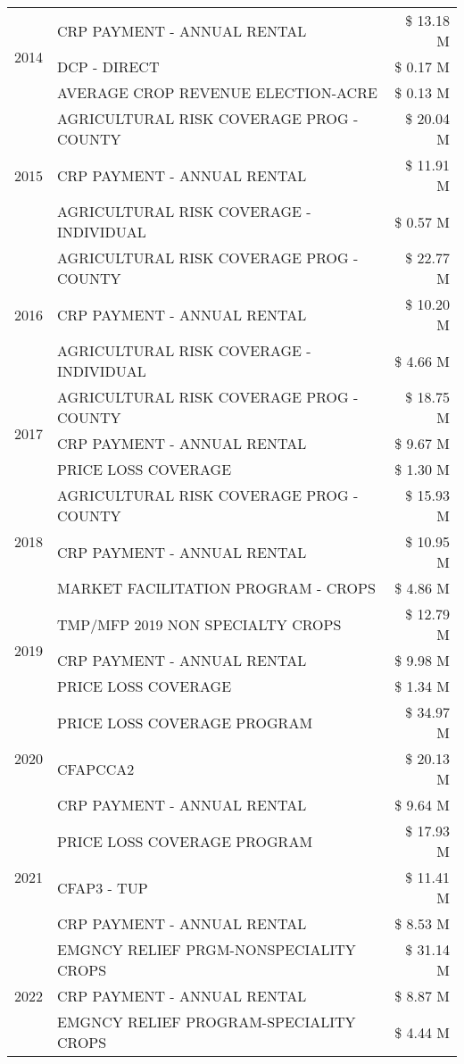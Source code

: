\begin{tabular}{llr}
\cline{1-3}
\multirow[t]{3}{*}{2014} & CRP PAYMENT - ANNUAL RENTAL & \$ 13.18 M \\
 & DCP - DIRECT & \$ 0.17 M \\
 & AVERAGE CROP REVENUE ELECTION-ACRE & \$ 0.13 M \\
\cline{1-3}
\multirow[t]{3}{*}{2015} & AGRICULTURAL RISK COVERAGE PROG - COUNTY & \$ 20.04 M \\
 & CRP PAYMENT - ANNUAL RENTAL & \$ 11.91 M \\
 & AGRICULTURAL RISK COVERAGE - INDIVIDUAL & \$ 0.57 M \\
\cline{1-3}
\multirow[t]{3}{*}{2016} & AGRICULTURAL RISK COVERAGE PROG - COUNTY & \$ 22.77 M \\
 & CRP PAYMENT - ANNUAL RENTAL & \$ 10.20 M \\
 & AGRICULTURAL RISK COVERAGE - INDIVIDUAL & \$ 4.66 M \\
\cline{1-3}
\multirow[t]{3}{*}{2017} & AGRICULTURAL RISK COVERAGE PROG - COUNTY & \$ 18.75 M \\
 & CRP PAYMENT - ANNUAL RENTAL & \$ 9.67 M \\
 & PRICE LOSS COVERAGE & \$ 1.30 M \\
\cline{1-3}
\multirow[t]{3}{*}{2018} & AGRICULTURAL RISK COVERAGE PROG - COUNTY & \$ 15.93 M \\
 & CRP PAYMENT - ANNUAL RENTAL & \$ 10.95 M \\
 & MARKET FACILITATION PROGRAM - CROPS & \$ 4.86 M \\
\cline{1-3}
\multirow[t]{3}{*}{2019} & TMP/MFP 2019 NON SPECIALTY CROPS & \$ 12.79 M \\
 & CRP PAYMENT - ANNUAL RENTAL & \$ 9.98 M \\
 & PRICE LOSS COVERAGE & \$ 1.34 M \\
\cline{1-3}
\multirow[t]{3}{*}{2020} & PRICE LOSS COVERAGE PROGRAM & \$ 34.97 M \\
 & CFAPCCA2 & \$ 20.13 M \\
 & CRP PAYMENT - ANNUAL RENTAL & \$ 9.64 M \\
\cline{1-3}
\multirow[t]{3}{*}{2021} & PRICE LOSS COVERAGE PROGRAM & \$ 17.93 M \\
 & CFAP3 - TUP & \$ 11.41 M \\
 & CRP PAYMENT - ANNUAL RENTAL & \$ 8.53 M \\
\cline{1-3}
\multirow[t]{3}{*}{2022} & EMGNCY RELIEF PRGM-NONSPECIALITY CROPS & \$ 31.14 M \\
 & CRP PAYMENT - ANNUAL RENTAL & \$ 8.87 M \\
 & EMGNCY RELIEF PROGRAM-SPECIALITY CROPS & \$ 4.44 M \\
\cline{1-3}
\bottomrule
\end{tabular}
